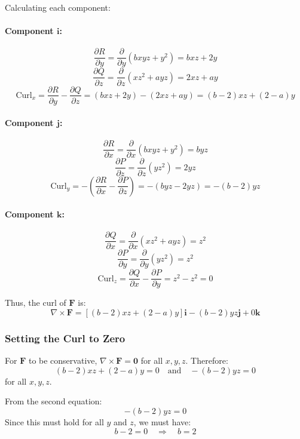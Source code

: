 \documentclass[11pt]{article}
\begin{document}
Calculating each component:

\paragraph{Component \( \mathbf{i} \):}
\[
\frac{\partial R}{\partial y} = \frac{\partial}{\partial y} (b x y z + y^2) = b x z + 2y
\]
\[
\frac{\partial Q}{\partial z} = \frac{\partial}{\partial z} (x z^2 + a y z) = 2x z + a y
\]
\[
\text{Curl}_x = \frac{\partial R}{\partial y} - \frac{\partial Q}{\partial z} = (b x z + 2y) - (2x z + a y) = (b - 2)x z + (2 - a) y
\]

\paragraph{Component \( \mathbf{j} \):}
\[
\frac{\partial R}{\partial x} = \frac{\partial}{\partial x} (b x y z + y^2) = b y z
\]
\[
\frac{\partial P}{\partial z} = \frac{\partial}{\partial z} (y z^2) = 2 y z
\]
\[
\text{Curl}_y = -\left( \frac{\partial R}{\partial x} - \frac{\partial P}{\partial z} \right) = - (b y z - 2 y z) = - (b - 2) y z
\]

\paragraph{Component \( \mathbf{k} \):}
\[
\frac{\partial Q}{\partial x} = \frac{\partial}{\partial x} (x z^2 + a y z) = z^2
\]
\[
\frac{\partial P}{\partial y} = \frac{\partial}{\partial y} (y z^2) = z^2
\]
\[
\text{Curl}_z = \frac{\partial Q}{\partial x} - \frac{\partial P}{\partial y} = z^2 - z^2 = 0
\]

Thus, the curl of \( \mathbf{F} \) is:
\[
\nabla \times \mathbf{F} = \left[ (b - 2)x z + (2 - a) y \right] \mathbf{i} - (b - 2) y z \mathbf{j} + 0 \mathbf{k}
\]

\subsubsection*{Setting the Curl to Zero}

For \( \mathbf{F} \) to be conservative, \( \nabla \times \mathbf{F} = \mathbf{0} \) for all \( x, y, z \). Therefore:
\[
(b - 2)x z + (2 - a) y = 0 \quad \text{and} \quad - (b - 2) y z = 0
\]
for all \( x, y, z \).

From the second equation:
\[
- (b - 2) y z = 0
\]
Since this must hold for all \( y \) and \( z \), we must have:
\[
b - 2 = 0 \quad \Rightarrow \quad b = 2
\]
\end{document}

